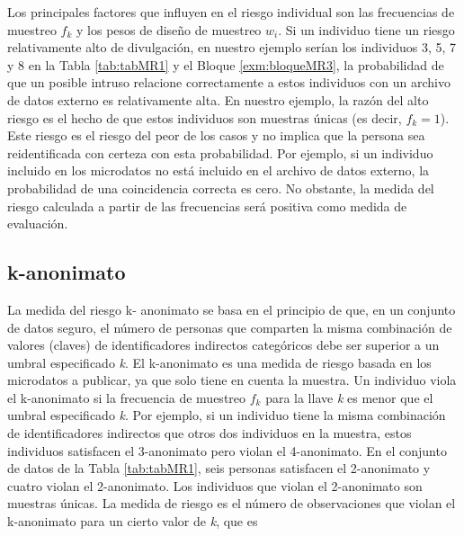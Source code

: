 \documentclass[]{book}
\newenvironment{Shaded}{\begin{snugshade}}{\end{snugshade}}
\newcommand{\NormalTok}[1]{#1}
\newcommand{\OperatorTok}[1]{\textcolor[rgb]{0.81,0.36,0.00}{\textbf{#1}}}
\theoremstyle{definition}
\theoremstyle{definition}
\theoremstyle{definition}
\theoremstyle{definition}
\theoremstyle{remark}
\begin{document}
\begin{Shaded}
\end{Shaded}

Los principales factores que influyen en el riesgo individual son las frecuencias de muestreo \(f_{k}\) y los pesos de diseño de muestreo \(w_{i}\). Si un individuo tiene un riesgo relativamente alto de divulgación, en nuestro ejemplo serían los individuos 3, 5, 7 y 8 en la Tabla \ref{tab:tabMR1} y el Bloque \ref{exm:bloqueMR3}, la probabilidad de que un posible intruso relacione correctamente a estos individuos con un archivo de datos externo es relativamente alta. En nuestro ejemplo, la razón del alto riesgo es el hecho de que estos individuos son muestras únicas (es decir, \(f_{k}=1\)). Este riesgo es el riesgo del peor de los casos y no implica que la persona sea reidentificada con certeza con esta probabilidad. Por ejemplo, si un individuo incluido en los microdatos no está incluido en el archivo de datos externo, la probabilidad de una coincidencia correcta es cero. No obstante, la medida del riesgo calculada a partir de las frecuencias será positiva como medida de evaluación.

\hypertarget{k-anonimato}{%
\subsection{k-anonimato}\label{k-anonimato}}

La medida del riesgo k- anonimato se basa en el principio de que, en un conjunto de datos seguro, el número de personas que comparten la misma combinación de valores (claves) de identificadores indirectos categóricos debe ser superior a un umbral especificado \emph{k}. El k-anonimato es una medida de riesgo basada en los microdatos a publicar, ya que solo tiene en cuenta la muestra. Un individuo viola el k-anonimato si la frecuencia de muestreo \(f_{k}\) para la llave \emph{k} es menor que el umbral especificado \emph{k}. Por ejemplo, si un individuo tiene la misma combinación de identificadores indirectos que otros dos individuos en la muestra, estos individuos satisfacen el 3-anonimato pero violan el 4-anonimato. En el conjunto de datos de la Tabla \ref{tab:tabMR1}, seis personas satisfacen el 2-anonimato y cuatro violan el 2-anonimato. Los individuos que violan el 2-anonimato son muestras únicas. La medida de riesgo es el número de observaciones que violan el k-anonimato para un cierto valor de \emph{k}, que es
\end{document}
